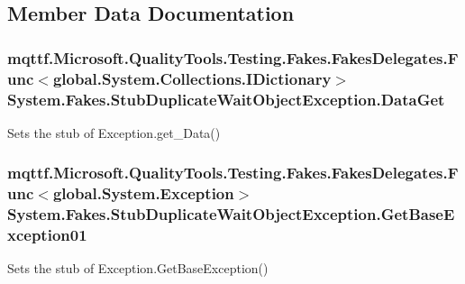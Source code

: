 \subsection{Member Data Documentation}
\hypertarget{class_system_1_1_fakes_1_1_stub_duplicate_wait_object_exception_a2e94a0c2a715c9d7753786c5b59abf94}{
\subsubsection[{Data\-Get}]{\setlength{\rightskip}{0pt plus 5cm}mqttf.\-Microsoft.\-Quality\-Tools.\-Testing.\-Fakes.\-Fakes\-Delegates.\-Func$<$global.\-System.\-Collections.\-I\-Dictionary$>$ System.\-Fakes.\-Stub\-Duplicate\-Wait\-Object\-Exception.\-Data\-Get}}\label{class_system_1_1_fakes_1_1_stub_duplicate_wait_object_exception_a2e94a0c2a715c9d7753786c5b59abf94}


Sets the stub of Exception.\-get\-\_\-\-Data()

\hypertarget{class_system_1_1_fakes_1_1_stub_duplicate_wait_object_exception_ac81732542f7e9aa9c1f297e41e21380f}{
\subsubsection[{Get\-Base\-Exception01}]{\setlength{\rightskip}{0pt plus 5cm}mqttf.\-Microsoft.\-Quality\-Tools.\-Testing.\-Fakes.\-Fakes\-Delegates.\-Func$<$global.\-System.\-Exception$>$ System.\-Fakes.\-Stub\-Duplicate\-Wait\-Object\-Exception.\-Get\-Base\-Exception01}}\label{class_system_1_1_fakes_1_1_stub_duplicate_wait_object_exception_ac81732542f7e9aa9c1f297e41e21380f}


Sets the stub of Exception.\-Get\-Base\-Exception()

